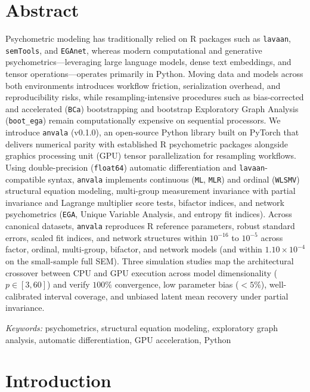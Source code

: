 ﻿\documentclass[12pt,letterpaper]{article}
\begin{document}
\section*{Abstract}
\noindent Psychometric modeling has traditionally relied on R packages such as \texttt{lavaan}, \texttt{semTools}, and \texttt{EGAnet}, whereas modern computational and generative psychometrics---leveraging large language models, dense text embeddings, and tensor operations---operates primarily in Python. Moving data and models across both environments introduces workflow friction, serialization overhead, and reproducibility risks, while resampling-intensive procedures such as bias-corrected and accelerated (\texttt{BCa}) bootstrapping and bootstrap Exploratory Graph Analysis (\texttt{boot\_ega}) remain computationally expensive on sequential processors. We introduce \texttt{anvala} (v0.1.0), an open-source Python library built on PyTorch that delivers numerical parity with established R psychometric packages alongside graphics processing unit (GPU) tensor parallelization for resampling workflows. Using double-precision (\texttt{float64}) automatic differentiation and \texttt{lavaan}-compatible syntax, \texttt{anvala} implements continuous (\texttt{ML}, \texttt{MLR}) and ordinal (\texttt{WLSMV}) structural equation modeling, multi-group measurement invariance with partial invariance and Lagrange multiplier score tests, bifactor indices, and network psychometrics (\texttt{EGA}, Unique Variable Analysis, and entropy fit indices). Across canonical datasets, \texttt{anvala} reproduces R reference parameters, robust standard errors, scaled fit indices, and network structures within $10^{-16}$ to $10^{-5}$ across factor, ordinal, multi-group, bifactor, and network models (and within $1.10 \times 10^{-4}$ on the small-sample full SEM). Three simulation studies map the architectural crossover between CPU and GPU execution across model dimensionality ($p \in [3, 60]$) and verify $100\%$ convergence, low parameter bias ($< 5\%$), well-calibrated interval coverage, and unbiased latent mean recovery under partial invariance.

\vspace{0.5cm}
\noindent \textit{Keywords:} psychometrics, structural equation modeling, exploratory graph analysis, automatic differentiation, GPU acceleration, Python
\newpage

\section{Introduction}
\end{document}
